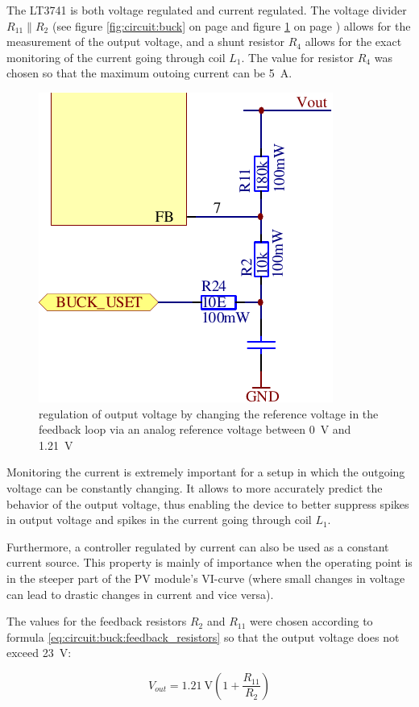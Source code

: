 The  LT3741  is both  voltage  regulated  and current  regulated. The  voltage
divider  $R_{11} \parallel  R_2$  (see figure  \ref{fig:circuit:buck} on  page
\pageref{fig:circuit:buck}  and  figure  \ref{fig:circuit:buck:uset}  on  page
\pageref{fig:circuit:buck:uset})  allows for  the  measurement  of the  output
voltage, and  a shunt resistor  $R_4$ allows for  the exact monitoring  of the
current going through  coil $L_1$. The value for resistor $R_4$  was chosen so
that the maximum outoing current can be \SI{5}{\ampere}.

\begin{figure}[th!]
    \center
    \includegraphics[width=.35\textwidth]{images/circuit/buck-uset.pdf}
    \caption{regulation of output voltage by changing the reference voltage in the feedback loop via an analog reference voltage between \SI{0}{\volt} and \SI{1.21}{\volt}}
    \label{fig:circuit:buck:uset}
\end{figure}

Monitoring  the current  is  extremely  important for  a  setup  in which  the
outgoing  voltage can  be constantly  changing. It allows  to more  accurately
predict the behavior of the output voltage, thus enabling the device to better
suppress spikes in output voltage and spikes in the current going through coil
$L_1$. %

Furthermore, a controller regulated by current  can also be used as a constant
current source. This property is mainly of importance when the operating point
is in  the steeper part  of the PV module's  VI-curve (where small  changes in
voltage can lead to drastic changes in current and vice versa).

The values for the feedback resistors $R_2$ and $R_{11}$ were chosen according
to formula \ref{eq:circuit:buck:feedback_resistors} so that the output voltage
does not exceed \SI{23}{\volt}:

\begin{equation}
    V_{out} = \SI{1.21}{\volt} \left( 1 + \frac{R_{11}}{R_2} \right)
    \label{eq:circuit:buck:feedback_resistors}
\end{equation}

